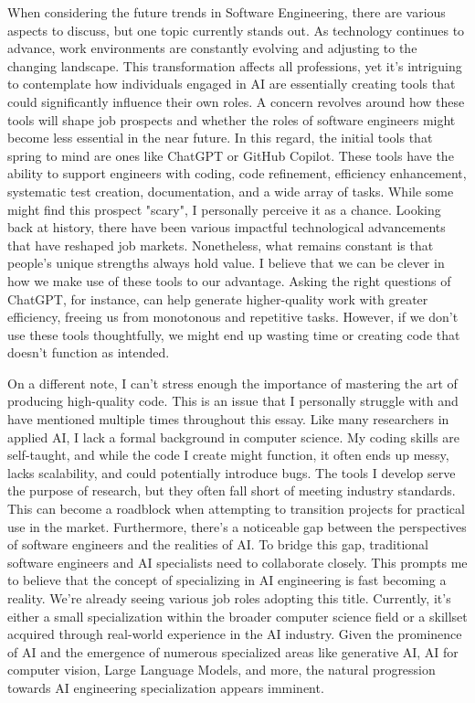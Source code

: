 \documentclass[11pt]{article}
\begin{document}
When considering the future trends in Software Engineering, there are various aspects to discuss, but one topic currently stands out. As technology continues to advance, work environments are constantly evolving and adjusting to the changing landscape. This transformation affects all professions, yet it's intriguing to contemplate how individuals engaged in AI are essentially creating tools that could significantly influence their own roles. A concern revolves around how these tools will shape job prospects and whether the roles of software engineers might become less essential in the near future. 
In this regard, the initial tools that spring to mind are ones like ChatGPT or GitHub Copilot. These tools have the ability to support engineers with coding, code refinement, efficiency enhancement, systematic test creation, documentation, and a wide array of tasks. While some might find this prospect "scary", I personally perceive it as a chance. Looking back at history, there have been various impactful technological advancements that have reshaped job markets. Nonetheless, what remains constant is that people's unique strengths always hold value.
I believe that we can be clever in how we make use of these tools to our advantage. Asking the right questions of ChatGPT, for instance, can help generate higher-quality work with greater efficiency, freeing us from monotonous and repetitive tasks. However, if we don't use these tools thoughtfully, we might end up wasting time or creating code that doesn't function as intended.

 
On a different note, I can't stress enough the importance of mastering the art of producing high-quality code. This is an issue that I personally struggle with and have mentioned multiple times throughout this essay. Like many researchers in applied AI, I lack a formal background in computer science. My coding skills are self-taught, and while the code I create might function, it often ends up messy, lacks scalability, and could potentially introduce bugs. The tools I develop serve the purpose of research, but they often fall short of meeting industry standards. This can become a roadblock when attempting to transition projects for practical use in the market.
Furthermore, there's a noticeable gap between the perspectives of software engineers and the realities of AI. To bridge this gap, traditional software engineers and AI specialists need to collaborate closely. This prompts me to believe that the concept of specializing in AI engineering is fast becoming a reality. We're already seeing various job roles adopting this title. Currently, it's either a small specialization within the broader computer science field or a skillset acquired through real-world experience in the AI industry. Given the prominence of AI and the emergence of numerous specialized areas like generative AI, AI for computer vision, Large Language Models, and more, the natural progression towards AI engineering specialization appears imminent.




\end{document}

